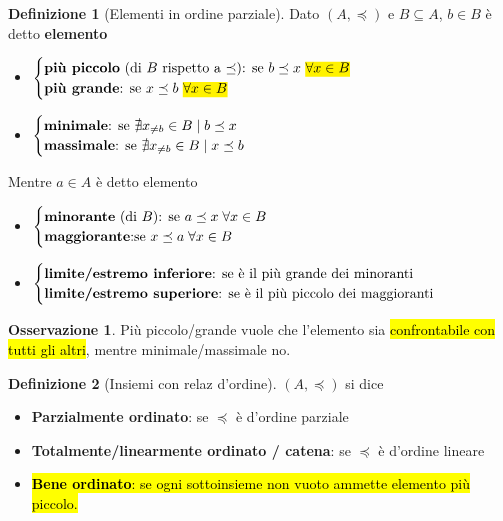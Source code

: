 \documentclass[a4paper,10pt]{article}
\theoremstyle{definition}
\theoremstyle{indentdefinition}
\newtheorem{defn}{Definizione}[section]
\theoremstyle{indentpostulate}
\theoremstyle{indenttheorem}
\theoremstyle{myremark}
\newtheorem*{rem*}{Osservazione}
\theoremstyle{indentgeneral}
\begin{document}
\begin{defn}[Elementi in ordine parziale] 
    Dato $(A,\preceq)$ e $B\subseteq A$, $b\in B$ è detto \textbf{elemento}
    \begin{itemize}
        \item $\begin{cases}
            \text{\textbf{più piccolo} (di $B$ rispetto a $\preceq$): se $b\preceq x$ \hl{$\forall x\in B$}} \\
            \text{\textbf{più grande}: se $x\preceq b$ \hl{$\forall x\in B$}}
        \end{cases}$ 
        \item $\begin{cases}
            \text{\textbf{minimale}: se $\nexists x_{\neq b}\in B\mid b\preceq x$} \\
            \text{\textbf{massimale}: se $\nexists x_{\neq b}\in B\mid x\preceq b$}
        \end{cases}$ 
    \end{itemize}
    Mentre $a\in A$ è detto elemento
    \begin{itemize}
        \item $\begin{cases}
            \text{\textbf{minorante} (di $B$): se $a\preceq x\;\forall x\in B$ } \\
            \text{\textbf{maggiorante}:se $x\preceq a\;\forall x\in B$}
        \end{cases}$ 
        \item $\begin{cases}
            \text{\textbf{limite/estremo inferiore}: se è il più grande dei minoranti} \\
            \text{\textbf{limite/estremo superiore}: se è il più piccolo dei maggioranti}
        \end{cases}$ 
    \end{itemize}
\end{defn}
\begin{rem*}
    Più piccolo/grande vuole che l'elemento sia \hl{confrontabile con tutti gli altri}, mentre minimale/massimale no.
\end{rem*}

\begin{defn}[Insiemi con relaz d'ordine] $(A,\preceq)$ si dice
\begin{itemize}
    \item \textbf{Parzialmente ordinato}: se $\preceq$ è d'ordine parziale
    \item \textbf{Totalmente/linearmente ordinato / catena}: se $\preceq$ è d'ordine lineare
    \item \hl{\textbf{Bene ordinato}: se ogni sottoinsieme non vuoto ammette elemento più piccolo.}
\end{itemize}
\end{defn}
\end{document}
